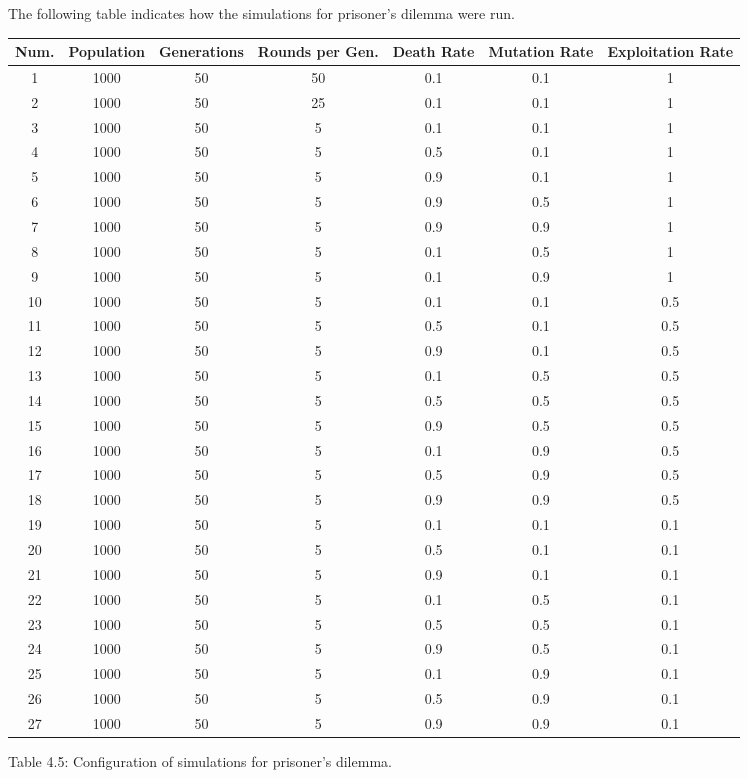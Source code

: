 \documentclass{article}
\begin{document}
The following table indicates how the simulations for prisoner's dilemma were run.
\begin{center}
\begin{tabular}{|c|c|c|c|c|c|c|}
\hline
Num. & Population & Generations& Rounds per Gen. & Death Rate & Mutation Rate & Exploitation Rate\\ 
\hline
1& 1000 & 50 & 50 & 0.1 & 0.1 & 1\\
\hline
2& 1000 & 50 & 25 & 0.1 & 0.1 & 1\\
\hline
3& 1000 & 50 & 5 & 0.1 & 0.1 & 1\\
\hline
4& 1000 & 50 & 5 & 0.5 & 0.1 & 1\\
\hline
5& 1000 & 50 & 5 & 0.9 & 0.1 & 1\\
\hline
6& 1000 & 50 & 5 & 0.9 & 0.5 & 1\\
\hline
7& 1000 & 50 & 5 & 0.9 & 0.9 & 1\\
\hline
8& 1000 & 50 & 5 & 0.1 & 0.5 & 1\\
\hline
9& 1000 & 50 & 5 & 0.1 & 0.9 & 1\\
\hline
10& 1000 & 50 & 5 & 0.1 & 0.1 & 0.5\\
\hline
11& 1000 & 50 & 5 & 0.5 & 0.1 & 0.5\\
\hline
12& 1000 & 50 & 5 & 0.9 & 0.1 & 0.5\\
\hline
13& 1000 & 50 & 5 & 0.1 & 0.5 & 0.5\\
\hline
14& 1000 & 50 & 5 & 0.5 & 0.5 & 0.5\\
\hline
15& 1000 & 50 & 5 & 0.9 & 0.5 & 0.5\\
\hline
16& 1000 & 50 & 5 & 0.1 & 0.9 & 0.5\\
\hline
17& 1000 & 50 & 5 & 0.5 & 0.9 & 0.5\\
\hline
18& 1000 & 50 & 5 & 0.9 & 0.9 & 0.5\\
\hline
19& 1000 & 50 & 5 & 0.1 & 0.1 & 0.1\\
\hline
20& 1000 & 50 & 5 & 0.5 & 0.1 & 0.1\\
\hline
21& 1000 & 50 & 5 & 0.9 & 0.1 & 0.1\\
\hline
22& 1000 & 50 & 5 & 0.1 & 0.5 & 0.1\\
\hline
23& 1000 & 50 & 5 & 0.5 & 0.5 & 0.1\\
\hline
24& 1000 & 50 & 5 & 0.9 & 0.5 & 0.1\\
\hline
25& 1000 & 50 & 5 & 0.1 & 0.9& 0.1\\
\hline
26& 1000 & 50 & 5 & 0.5 & 0.9 & 0.1\\
\hline
27& 1000 & 50 & 5 & 0.9 & 0.9 & 0.1\\
\hline
\end{tabular}
\end{center}
\begin{center}
Table 4.5: Configuration of simulations for prisoner's dilemma.
\end{center}
\end{document}
